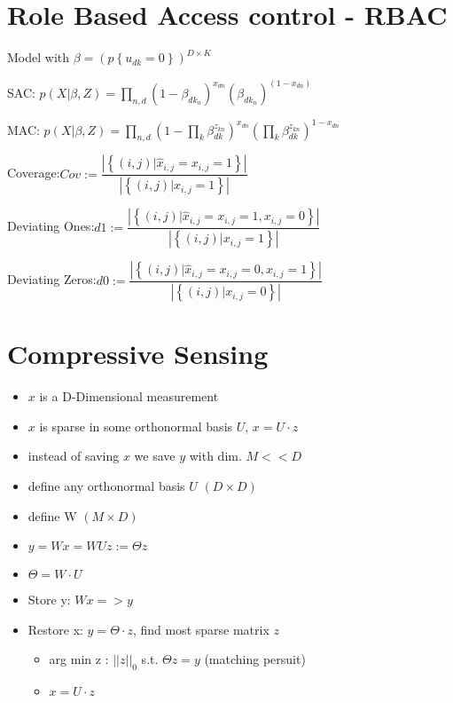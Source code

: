 \documentclass[11pt,twocolumn]{article}
\begin{document}
\section{Role Based Access control - RBAC}
Model with $\beta = (p\left\lbrace u_{dk}=0\right\rbrace)^{D \times K}$

SAC: $p(X|\beta,Z) = \prod\limits_{n,d}(1-\beta_{dk_n})^{x_{dn}}(\beta_{dk_n})^{(1-x_{dn})}$

MAC: $p(X|\beta,Z) = \prod\limits_{n,d}(1-\prod\limits_k \beta_{dk}^{z_{kn}})^{x_{dn}}(\prod\limits_k\beta_{dk}^{z_{kn}})^{1-x_{dn}}$

Coverage:$Cov:=\dfrac{|\left\lbrace(i,j)|\hat{x}_{i,j}=x_{i,j}=1\right\rbrace|}{|\left\lbrace(i,j)|x_{i,j}=1 \right\rbrace|}$

Deviating Ones:$d1:=\dfrac{|\left\lbrace(i,j)|\hat{x}_{i,j}=x_{i,j}=1,x_{i,j}=0\right\rbrace|}{|\left\lbrace(i,j)|x_{i,j}=1 \right\rbrace|}$

Deviating Zeros:$d0:=\dfrac{|\left\lbrace(i,j)|\hat{x}_{i,j}=x_{i,j}=0,x_{i,j}=1\right\rbrace|}{|\left\lbrace(i,j)|x_{i,j}=0 \right\rbrace|}$

\section{Compressive Sensing}

\begin{itemize}
\item $x$ is a D-Dimensional measurement
\item $x$ is sparse in some orthonormal basis $U$, $x = U \cdot z$
\item instead of saving $x$ we save $y$ with dim. $M<<D$
\item define any orthonormal basis $U$ $(D \times D)$
\item define W $(M \times D)$
\item $y = Wx = WUz := \Theta z$

\item $\Theta = W \cdot U$
\item Store y: $Wx => y$
\item Restore x: $y = \Theta \cdot z$, find most sparse matrix $z$
	\begin{itemize}
	\item arg min z :  $||z||_0$  s.t.  $\Theta z  = y$ (matching persuit)
	\item $x = U \cdot z$
  	\end{itemize}
\end{itemize}
\end{document}

